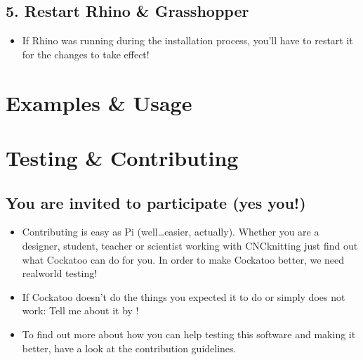\documentclass[letterpaper,10pt,english]{sphinxmanual}
\begin{document}
\subsection{5. Restart Rhino \& Grasshopper}
\label{\detokenize{README:restart-rhino-grasshopper}}\label{\detokenize{README:id6}}\begin{itemize}
\item {} 
If Rhino was running during the installation process, you’ll have to
restart it for the changes to take effect!

\end{itemize}


\section{Examples \& Usage}
\label{\detokenize{README:examples-usage}}\label{\detokenize{README:id7}}

\section{Testing \& Contributing}
\label{\detokenize{README:testing-contributing}}\label{\detokenize{README:id8}}

\subsection{You are invited to participate (yes \sphinxhyphen{} you!)}
\label{\detokenize{README:you-are-invited-to-participate-yes-you}}\label{\detokenize{README:id9}}\begin{itemize}
\item {} 
Contributing is easy as Pi (well…easier, actually). Whether you are
a designer, student, teacher or scientist working with CNC\sphinxhyphen{}knitting \sphinxhyphen{}
just find out what Cockatoo can do for you. In order to make Cockatoo
better, we need real\sphinxhyphen{}world testing!

\item {} 
If Cockatoo doesn’t do the things you expected it to do or simply
does not work: Tell me about it by !

\item {} 
To find out more about how you can help testing this software and
making it better, have a look at the contribution guidelines.

\end{itemize}
\end{document}
